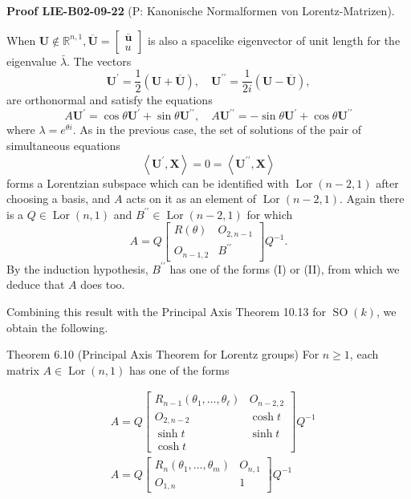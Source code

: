 \documentclass[10pt, letterpaper]{article}
\newcommand{\CustomHeading}[3]{%
  \par\medskip\noindent%
  \textbf{#1 #2} \textnormal{(#3)}.\enskip%
}
\newenvironment{PROOF}[2]{\begin{unitbox}\CustomHeading{Proof}{#1}{#2}}{\end{unitbox}}
\begin{document}
\begin{PROOF}{LIE-B02-09-22}{P: Kanonische Normalformen von Lorentz-Matrizen}
When $\mathbf{U} \notin \mathbb{R}^{n, 1}, \overline{\mathbf{U}}=\left[\begin{array}{l}\overline{\mathbf{u}} \\ u\end{array}\right]$ is also a spacelike eigenvector of unit length for the eigenvalue $\bar{\lambda}$. The vectors
$$
\mathbf{U}^{\prime}=\frac{1}{2}(\mathbf{U}+\overline{\mathbf{U}}), \quad \mathbf{U}^{\prime \prime}=\frac{1}{2 i}(\mathbf{U}-\overline{\mathbf{U}}),
$$
are orthonormal and satisfy the equations
$$
A \mathbf{U}^{\prime}=\cos \theta \mathbf{U}^{\prime}+\sin \theta \mathbf{U}^{\prime \prime}, \quad A \mathbf{U}^{\prime \prime}=-\sin \theta \mathbf{U}^{\prime}+\cos \theta \mathbf{U}^{\prime \prime}
$$
where $\lambda=e^{\theta i}$. As in the previous case, the set of solutions of the pair of simultaneous equations
$$
\left\langle\mathbf{U}^{\prime}, \mathbf{X}\right\rangle=0=\left\langle\mathbf{U}^{\prime \prime}, \mathbf{X}\right\rangle
$$
forms a Lorentzian subspace which can be identified with $\operatorname{Lor}(n-2,1)$ after choosing a basis, and $A$ acts on it as an element of $\operatorname{Lor}(n-2,1)$. Again there is a $Q \in \operatorname{Lor}(n, 1)$ and $B^{\prime \prime} \in \operatorname{Lor}(n-2,1)$ for which
$$
A=Q\left[\begin{array}{cc}
R(\theta) & O_{2, n-1} \\
O_{n-1,2} & B^{\prime \prime}
\end{array}\right] Q^{-1} .
$$
By the induction hypothesis, $B^{\prime \prime}$ has one of the forms (I) or (II), from which we deduce that $A$ does too.
\end{PROOF}




Combining this result with the Principal Axis Theorem 10.13 for $\operatorname{SO}(k)$, we obtain the following.

Theorem 6.10 (Principal Axis Theorem for Lorentz groups)
For $n \geqslant 1$, each matrix $A \in \operatorname{Lor}(n, 1)$ has one of the forms

$$
\begin{aligned}
& A=Q\left[\begin{array}{cc}
R_{n-1}\left(\theta_{1}, \ldots, \theta_{\ell}\right) & O_{n-2,2} \\
O_{2, n-2} & \cosh t \\
\sinh t & \sinh t \\
\cosh t
\end{array}\right] Q^{-1} \\
& A=Q\left[\begin{array}{cc}
R_{n}\left(\theta_{1}, \ldots, \theta_{m}\right) & O_{n, 1} \\
O_{1, n} & 1
\end{array}\right] Q^{-1}
\end{aligned}
$$
\end{document}
